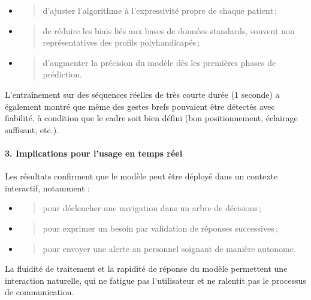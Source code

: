 \documentclass[
]{article}
\begin{document}
\begin{itemize}
\item
  \begin{quote}
  d'ajuster l'algorithme à l'expressivité propre de chaque patient\,;
  \end{quote}
\item
  \begin{quote}
  de réduire les biais liés aux bases de données standards, souvent non représentatives des profils polyhandicapés\,;
  \end{quote}
\item
  \begin{quote}
  d'augmenter la précision du modèle dès les premières phases de prédiction.
  \end{quote}
\end{itemize}

L'entraînement sur des séquences réelles de très courte durée (1 seconde) a également montré que même des gestes brefs pouvaient être détectés avec fiabilité, à condition que le cadre soit bien défini (bon positionnement, éclairage suffisant, etc.).

\hypertarget{implications-pour-lusage-en-temps-ruxe9el}{%
\paragraph{\texorpdfstring{\textbf{3. Implications pour l'usage en temps réel}}{3. Implications pour l'usage en temps réel}}\label{implications-pour-lusage-en-temps-ruxe9el}}

Les résultats confirment que le modèle peut être déployé dans un contexte interactif, notamment :

\begin{itemize}
\item
  \begin{quote}
  pour déclencher une navigation dans un arbre de décisions\,;
  \end{quote}
\item
  \begin{quote}
  pour exprimer un besoin par validation de réponses successives\,;
  \end{quote}
\item
  \begin{quote}
  pour envoyer une alerte au personnel soignant de manière autonome.
  \end{quote}
\end{itemize}

La fluidité de traitement et la rapidité de réponse du modèle permettent une interaction naturelle, qui ne fatigue pas l'utilisateur et ne ralentit pas le processus de communication.
\end{document}
